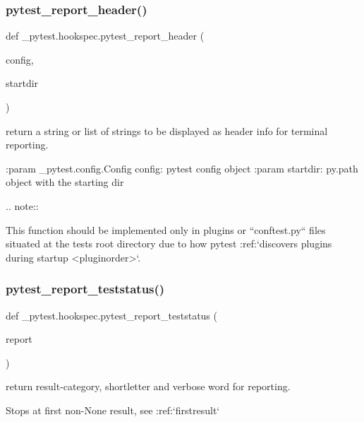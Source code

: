 \subsubsection{\texorpdfstring{pytest\+\_\+report\+\_\+header()}{pytest\_report\_header()}}
{\footnotesize\ttfamily def \+\_\+pytest.\+hookspec.\+pytest\+\_\+report\+\_\+header (\begin{DoxyParamCaption}\item[{}]{config,  }\item[{}]{startdir }\end{DoxyParamCaption})}

\begin{DoxyVerb}return a string or list of strings to be displayed as header info for terminal reporting.

:param _pytest.config.Config config: pytest config object
:param startdir: py.path object with the starting dir

.. note::

    This function should be implemented only in plugins or ``conftest.py``
    files situated at the tests root directory due to how pytest
    :ref:`discovers plugins during startup <pluginorder>`.
\end{DoxyVerb}
 \mbox{\label{namespace__pytest_1_1hookspec_ac4827fd1c51f0ba66748b1c316eb6f46}} 
\subsubsection{\texorpdfstring{pytest\+\_\+report\+\_\+teststatus()}{pytest\_report\_teststatus()}}
{\footnotesize\ttfamily def \+\_\+pytest.\+hookspec.\+pytest\+\_\+report\+\_\+teststatus (\begin{DoxyParamCaption}\item[{}]{report }\end{DoxyParamCaption})}

\begin{DoxyVerb}return result-category, shortletter and verbose word for reporting.

Stops at first non-None result, see :ref:`firstresult` \end{DoxyVerb}
 \mbox{\label{namespace__pytest_1_1hookspec_aa09a2fd2733026468a618d65d1594415}} 
